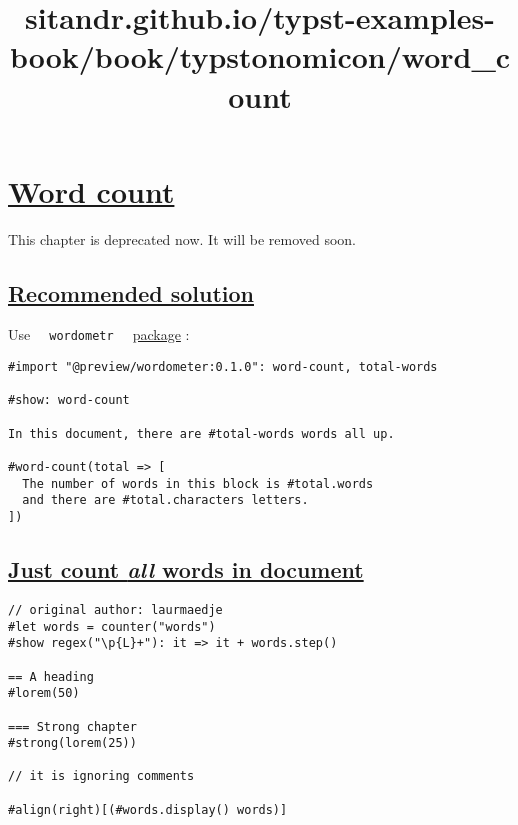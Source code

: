 \title{sitandr.github.io/typst-examples-book/book/typstonomicon/word_count}

\section{\texorpdfstring{\hyperref[word-count]{Word
count}}{Word count}}\label{word-count}

This chapter is deprecated now. It will be removed soon.

\subsection{\texorpdfstring{\hyperref[recommended-solution]{Recommended
solution}}{Recommended solution}}\label{recommended-solution}

Use \texttt{\ }{\texttt{\ wordometr\ }}\texttt{\ }
\href{https://github.com/Jollywatt/typst-wordometer}{package} :

\begin{verbatim}
#import "@preview/wordometer:0.1.0": word-count, total-words

#show: word-count

In this document, there are #total-words words all up.

#word-count(total => [
  The number of words in this block is #total.words
  and there are #total.characters letters.
])
\end{verbatim}

\pandocbounded{}

\subsection{\texorpdfstring{\hyperref[just-count-all-words-in-document]{Just
count \emph{all} words in
document}}{Just count all words in document}}\label{just-count-all-words-in-document}

\begin{verbatim}
// original author: laurmaedje
#let words = counter("words")
#show regex("\p{L}+"): it => it + words.step()

== A heading
#lorem(50)

=== Strong chapter
#strong(lorem(25))

// it is ignoring comments

#align(right)[(#words.display() words)]
\end{verbatim}

